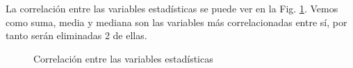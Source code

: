 La correlación entre las variables estadísticas se puede ver en la Fig. \ref{fig:corr}. Vemos como suma, media y mediana son las variables más correlacionadas entre sí, por tanto serán eliminadas 2 de ellas.

\begin{figure}
    \centering
    \caption{Correlación entre las variables estadísticas}
    \label{fig:corr}
\end{figure} 



